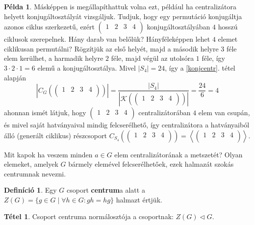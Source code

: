 \documentclass[12pt]{book}
\theoremstyle{plain} %
\theoremstyle{definition} %
\newtheorem{defi/}{Definíció}[section]
\newenvironment{defi}
  {\renewcommand{\qedsymbol}{$\clubsuit$}%
   \pushQED{\qed}\begin{defi/}}
  {\popQED\end{defi/}}
\newtheorem{pl}{Példa}[section]
\newtheorem{theo/}{Tétel}[section]
\newenvironment{theo}
  {\renewcommand{\qedsymbol}{$\clubsuit$}%
   \pushQED{\qed}\begin{theo/}}
  {\popQED\end{theo/}}
\theoremstyle{remark}
\renewcommand\qedsymbol{$\blacksquare$}
\numberwithin{equation}{section}  %
\begin{document}
\begin{pl}
		Másképpen is megállapíthattuk volna ezt, például ha centralizátora helyett konjugáltosztályát vizsgáljuk. Tudjuk, hogy egy permutáció konjugáltja azonos ciklus szerkezetű, ezért
		$\begin{pmatrix}
		1 & 2 & 3 & 4 \\
		\end{pmatrix}$ konjugáltosztályában $4$ hosszú ciklusok szerepelnek. Hány darab van belőlük? Hányféleképpen lehet $4$ elemet ciklikusan permutálni? Rögzítjük az első helyét, majd a második helyre $3$ féle elem kerülhet, a harmadik helyre $2$ féle, majd végül az utolsóra $1$ féle, így $3\cdot 2 \cdot 1= 6$ elemű a konjugáltosztálya. Mivel $|S_4| = 24$, így a \ref{konjcentr}. tétel alapján
		\[ \left|C_G\left(\begin{pmatrix}
		1 & 2 & 3 & 4 \\
		\end{pmatrix}\right)\right| = \dfrac{|S_4|}{\left|\mathcal{K}\left(\begin{pmatrix}
			1 & 2 & 3 & 4 \\
			\end{pmatrix}\right)\right|} = \dfrac{24}{6} = 4  \]
		ahonnan ismét látjuk, hogy $\begin{pmatrix}
		1 & 2 & 3 & 4 \\
		\end{pmatrix}$ centralizátorában $4$ elem van csupán, és mivel saját hatványaival mindig felcserélhető, így centralizátora a hatványaiból álló (generált ciklikus) részcsoport $C_{S_4} \left(\begin{pmatrix}
		1 & 2 & 3 & 4 \\
		\end{pmatrix}\right) = \left \langle \begin{pmatrix}
		1 & 2 & 3 & 4 \\
		\end{pmatrix} \right \rangle $.
	\end{pl}

	Mit kapok ha veszem minden $a\in G$ elem centralizátorának a metszetét? Olyan elemeket, amelyek $G$ bármely elemével felcserélhetőek, ezek halmazát szokás centrumnak nevezni.
	
	\begin{defi}
		Egy $G$ csoport \textbf{centrum}a alatt a $Z(G) = \{ g\in G \mid \forall h\in G\colon gh = hg  \}$ halmazt értjük.
	\end{defi}

	\begin{theo}\label{centnorm}
		Csoport centruma normálosztója a csoportnak: $Z(G)\triangleleft G$.
	\end{theo}
\end{document}
